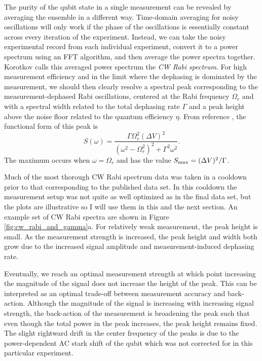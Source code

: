 The purity of the qubit state in a single measurement can be revealed by averaging the ensemble in a different way.  Time-domain averaging for noisy oscillations will only work if the phase of the oscillations is essentially constant across every iteration of the experiment.  Instead, we can take the noisy experimental record from each individual experiment, convert it to a power spectrum using an FFT algorithm, and then average the power spectra together.  Korotkov calls this averaged power spectrum the \textit{CW Rabi spectrum}.  For high measurement efficiency and in the limit where the dephasing is dominated by the measurement, we should then clearly resolve a spectral peak corresponding to the measurement-dephased Rabi oscillations, centered at the Rabi frequency $\Omega_r$ and with a spectral width related to the total dephasing rate $\Gamma$ and a peak height above the noise floor related to the quantum efficiency $\eta$.  From reference \cite{korotkov_p2p}, the functional form of this peak is
\begin{equation}
S(\omega) = \frac{\Gamma \Omega_r^2 (\Delta V)^2}{(\omega^2 - \Omega_r^2)^2 + \Gamma^2 \omega^2}.
\end{equation}
The maximum occurs when $\omega = \Omega_r$ and has the value $S_{\rm max} = (\Delta V)^2 / \Gamma$.

Much of the most thorough CW Rabi spectrum data was taken in a cooldown prior to that corresponding to the published data set.  In this cooldown the measurement setup was not quite as well optimized as in the final data set, but the plots are illustrative so I will use them in this and the next section.  An example set of CW Rabi spectra are shown in Figure \ref{fig:cw_rabi_and_gamma}a.  For relatively weak measurement, the peak height is small.  As the measurement strength is increased, the peak height and width both grow due to the increased signal amplitude and measurement-induced dephasing rate.

Eventually, we reach an optimal measurement strength at which point increasing the magnitude of the signal does not increase the height of the peak.  This can be interpreted as an optimal trade-off between measurement accuracy and back-action.  Although the magnitude of the signal is increasing with increasing signal strength, the back-action of the measurement is broadening the peak such that even though the total power in the peak increases, the peak height remains fixed.  The slight rightward drift in the center frequency of the peaks is due to the power-dependent AC stark shift of the qubit which was not corrected for in this particular experiment.

